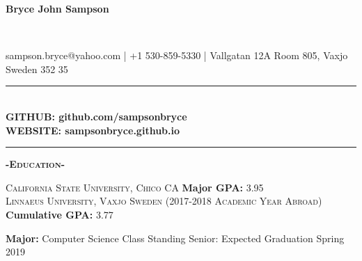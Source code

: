 \documentclass[12pt]{article}
\begin{document}
\center
\begin{Huge}\textbf{Bryce John Sampson}\end{Huge}\\
\medskip
\fontsize{12}{1.2}
\selectfont

\noindent
sampson.bryce@yahoo.com | +1 530-859-5330 | Vallgatan 12A Room 805, Vaxjo Sweden 352 35
\noindent\rule{17cm}{0.4pt}\\
\smallskip
\textbf{GITHUB: \color{TealBlue}github.com/sampsonbryce}\\
\smallskip
\textbf{WEBSITE: \color{TealBlue}sampsonbryce.github.io}\\
\smallskip
\noindent\rule{17cm}{0.4pt}

\center
\textbf{\textsc{-Education-}}\\
\flushleft
\begin{footnotesize}
\textsc{California State University, Chico CA}
\hfill
\color{Cerulean}\textbf{Major GPA: }\color{black}3.95\\

\color{black}
\smallskip
\textsc{Linnaeus University, Vaxjo Sweden (2017-2018 Academic Year Abroad)}
\hfill
\color{Cerulean}\textbf{Cumulative GPA: }\color{black}3.77\\
\smallskip

\color{Cerulean}\textbf{Major: }\color{black}Computer Science
\hfill
\color{gray}Class Standing Senior: Expected Graduation Spring 2019\\
\smallskip

\end{footnotesize}

\smallskip
\end{document}

